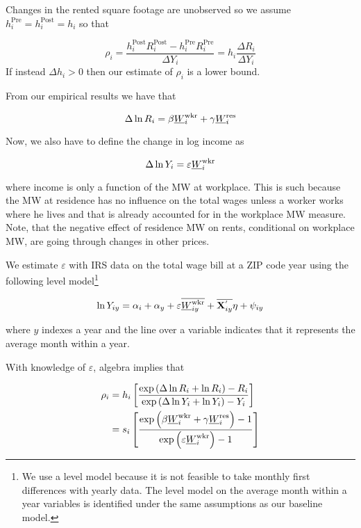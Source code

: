 Changes in the rented square footage are unobserved so we assume 
$h^{\text{Pre}}_i = h^{\text{Post}}_i = h_i$ so that

\begin{equation*}
	\rho_i = \frac{h^{\text{Post}}_i R^{\text{Post}}_i - h^{\text{Pre}}_i R^{\text{Pre}}_i}{\Delta Y_i} = 
	         h_i \frac{\Delta R_i}{\Delta Y_i}
\end{equation*}
If instead $\Delta h_i > 0$ then our estimate of $\rho_i$ is a lower bound.

From our empirical results we have that

\[
    \Delta \ln R_i = \beta \underline{W}_i^{\text{wkr}} + \gamma \underline{W}_i^{\text{res}}
\]

Now, we also have to define the change in log income as

\[
    \Delta \ln Y_i = \varepsilon \underline{W}_i^{\text{wkr}}
\]

where income is only a function of the MW at workplace. This is such because
the MW at residence has no influence on the total wages unless a worker works 
where he lives and that is already accounted for in the workplace MW measure. Note,
that the negative effect of residence MW on rents, conditional on workplace MW, are
going through changes in other prices. 

We estimate $\varepsilon$ with IRS data on the total wage bill at a ZIP code year using
the following level model\footnote{We use a level model because it is not feasible to 
take monthly first differences with yearly data. The level model on the average month 
within a year variables is identified under the same assumptions as our baseline model.}

\begin{equation}\label{eq:wage_level_model}
    \ln Y_{iy} = \alpha_i + \alpha_y + \varepsilon \overline{\underline{W}_{iy}^{\text{wkr}}} + 
                 \overline{\mathbf{X}^{'}_{iy}}\eta + \psi_{iy}
\end{equation}

where $y$ indexes a year and the line over a variable indicates that it represents 
the average month within a year.

With knowledge of $\varepsilon$, algebra implies that

\begin{equation}
	\begin{split}
		\rho_i & = h_i \left[ 
		\frac{\exp \left(\Delta \ln R_i + \ln R_i \right) - R_i }{\exp \left( \Delta \ln Y_i + \ln Y_i \right) - Y_i }
		\right] \\
		& = s_i \left[
		\frac{\exp \left( \beta \underline{W}_i^{\text{wkr}} + \gamma \underline{W}_i^{\text{res}} \right) - 1 }{\exp \left( \varepsilon \underline{W}_i^{\text{wkr}} \right) - 1 }
		\right]
	\end{split}
\end{equation}

